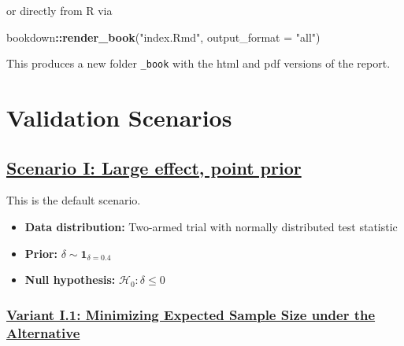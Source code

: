 \documentclass[
]{book}
\newenvironment{Shaded}{\begin{snugshade}}{\end{snugshade}}
\newcommand{\DataTypeTok}[1]{\textcolor[rgb]{0.13,0.29,0.53}{#1}}
\newcommand{\KeywordTok}[1]{\textcolor[rgb]{0.13,0.29,0.53}{\textbf{#1}}}
\newcommand{\NormalTok}[1]{#1}
\newcommand{\OperatorTok}[1]{\textcolor[rgb]{0.81,0.36,0.00}{\textbf{#1}}}
\newcommand{\StringTok}[1]{\textcolor[rgb]{0.31,0.60,0.02}{#1}}
\providecommand{\tightlist}{%
  \setlength{\itemsep}{0pt}\setlength{\parskip}{0pt}}
\begin{document}
or directly from R via

\begin{Shaded}
\begin{Highlighting}[]
\NormalTok{bookdown}\OperatorTok{::}\KeywordTok{render\_book}\NormalTok{(}\StringTok{"index.Rmd"}\NormalTok{, }\DataTypeTok{output\_format =} \StringTok{"all"}\NormalTok{)}
\end{Highlighting}
\end{Shaded}

This produces a new folder \texttt{\_book} with the html and pdf versions
of the report.

\hypertarget{validation-scenarios}{%
\section{Validation Scenarios}\label{validation-scenarios}}

\hypertarget{scenario-i-large-effect-point-prior}{%
\subsection{\texorpdfstring{\protect\hyperlink{scenarioI}{Scenario I: Large effect, point prior}}{Scenario I: Large effect, point prior}}\label{scenario-i-large-effect-point-prior}}

This is the default scenario.

\begin{itemize}
\tightlist
\item
  \textbf{Data distribution:} Two-armed trial with normally distributed test statistic
\item
  \textbf{Prior:} \(\delta\sim\textbf{1}_{\delta=0.4}\)
\item
  \textbf{Null hypothesis:} \(\mathcal{H}_0:\delta \leq 0\)
\end{itemize}

\hypertarget{variant-i.1-minimizing-expected-sample-size-under-the-alternative}{%
\subsubsection{\texorpdfstring{\protect\hyperlink{variantI_1}{Variant I.1: Minimizing Expected Sample Size under the Alternative}}{Variant I.1: Minimizing Expected Sample Size under the Alternative}}\label{variant-i.1-minimizing-expected-sample-size-under-the-alternative}}
\end{document}
